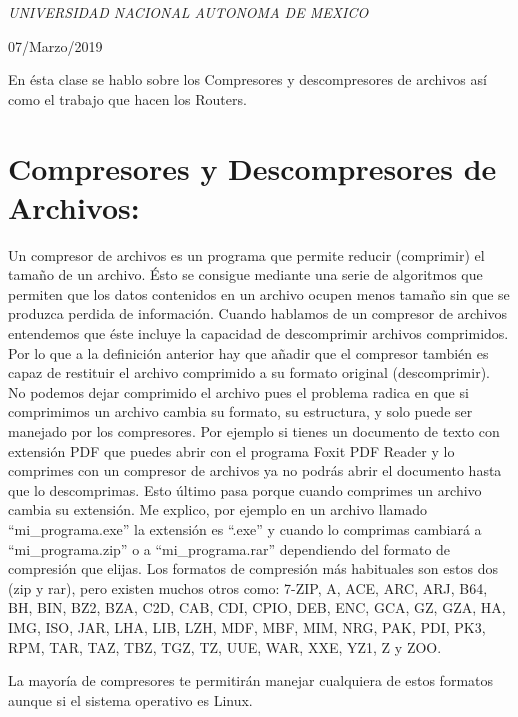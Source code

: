 \documentclass[a4paper, 11pt, oneside]{article}
\begin{document}
\begin{titlepage}
	\textit{UNIVERSIDAD NACIONAL AUTONOMA DE MEXICO} 
	
	\vfill
	
	
	
	
	\vspace{0.3\baselineskip} 
	
	07/Marzo/2019 
	
	 

\end{titlepage}

En ésta clase se hablo sobre los Compresores y descompresores de archivos así como el trabajo que hacen los Routers.

\section*{Compresores y Descompresores de Archivos:}
Un compresor de archivos es un programa que permite reducir (comprimir) el tamaño de un archivo. Ésto se consigue mediante una serie de algoritmos que permiten que los datos contenidos en un archivo ocupen menos tamaño sin que se produzca perdida de información. Cuando hablamos de un compresor de archivos entendemos que éste incluye la capacidad de descomprimir archivos comprimidos. Por lo que a la definición anterior hay que añadir que el compresor también es capaz de restituir el archivo comprimido a su formato original (descomprimir). No podemos dejar comprimido el archivo pues el problema radica en que si comprimimos un archivo cambia su formato, su estructura, y solo puede ser manejado por los compresores. Por ejemplo si tienes un documento de texto con extensión PDF que puedes abrir con el programa Foxit PDF Reader y lo comprimes con un compresor de archivos ya no podrás abrir el documento hasta que lo descomprimas. Esto último pasa porque cuando comprimes un archivo cambia su extensión. Me explico, por ejemplo en un archivo llamado “mi\_programa.exe” la extensión es “.exe” y cuando lo comprimas cambiará a “mi\_programa.zip” o a “mi\_programa.rar” dependiendo del formato de compresión que elijas. Los formatos de compresión más habituales son estos dos (zip y rar), pero existen muchos otros como: 7-ZIP, A, ACE, ARC, ARJ, B64, BH, BIN, BZ2, BZA, C2D, CAB, CDI, CPIO, DEB, ENC, GCA, GZ, GZA, HA, IMG, ISO, JAR, LHA, LIB, LZH, MDF, MBF, MIM, NRG, PAK, PDI, PK3, RPM, TAR, TAZ, TBZ, TGZ, TZ, UUE, WAR, XXE, YZ1, Z y ZOO.

La mayoría de compresores te permitirán manejar cualquiera de estos formatos aunque si el sistema operativo es Linux.
\end{document}
